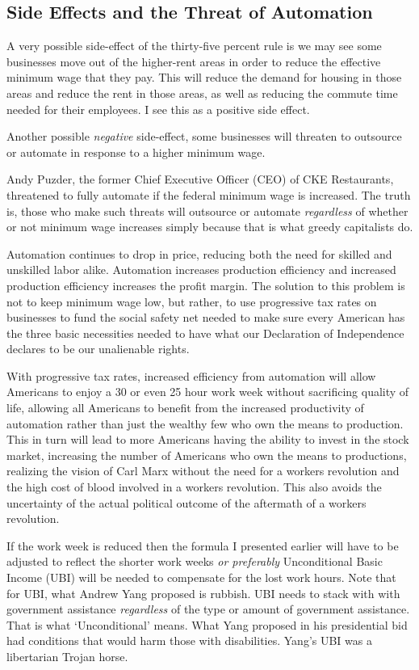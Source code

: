 \subsection{Side Effects and the Threat of Automation}

A very possible side-effect of the thirty-five percent rule is we may see some businesses move out of the higher-rent areas in order to reduce the effective minimum wage that they pay. This will reduce the demand for housing in those areas and reduce the rent in those areas, as well as reducing the commute time needed for their employees. I see this as a positive side effect.

Another possible \emph{negative} side-effect, some businesses will threaten to outsource or automate in response to a higher minimum wage.

Andy Puzder, the former Chief Executive Officer (CEO) of CKE Restaurants, threatened to fully automate if the federal minimum wage is increased. The truth is, those who make such threats will outsource or automate \emph{regardless} of whether or not minimum wage increases simply because that is what greedy capitalists do.

Automation continues to drop in price, reducing both the need for skilled and unskilled labor alike. Automation increases production efficiency and increased production efficiency increases the profit margin. The solution to this problem is not to keep minimum wage low, but rather, to use progressive tax rates on businesses to fund the social safety net needed to make sure every American has the three basic necessities needed to have what our Declaration of Independence declares to be our unalienable rights.

With progressive tax rates, increased efficiency from automation will allow Americans to enjoy a 30 or even 25 hour work week without sacrificing quality of life, allowing all Americans to benefit from the increased productivity of automation rather than just the wealthy few who own the means to production. This in turn will lead to more Americans having the ability to invest in the stock market, increasing the number of Americans who own the means to productions, realizing the vision of Carl Marx without the need for a workers revolution and the high cost of blood involved in a workers revolution. This also avoids the uncertainty of the actual political outcome of the aftermath of a workers revolution.

If the work week is reduced then the formula I presented earlier will have to be adjusted to reflect the shorter work weeks \emph{or preferably} Unconditional Basic Income (UBI) will be needed to compensate for the lost work hours. Note that for UBI, what Andrew Yang proposed is rubbish. UBI needs to stack with with government assistance \emph{regardless} of the type or amount of government assistance. That is what `Unconditional' means. What Yang proposed in his presidential bid had conditions that would harm those with disabilities. Yang's UBI was a libertarian Trojan horse.

